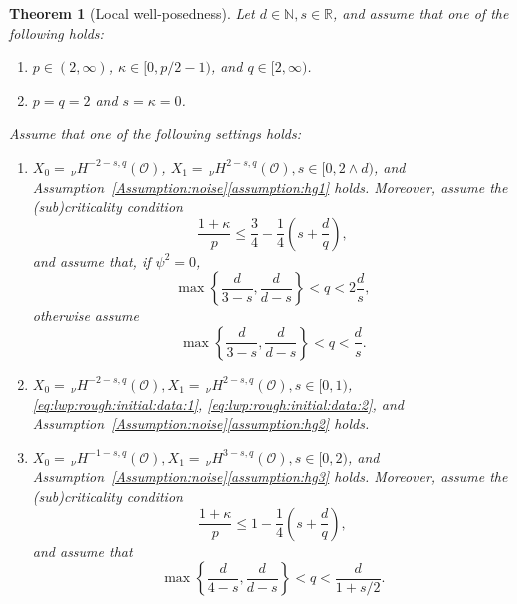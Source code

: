 \documentclass[reqno]{amsart}
\newtheorem{theorem}[Satz]{Theorem}
\newcommand{\N}{\mathbb{N}}
\newcommand{\R}{\mathbb{R}}
\newcommand{\sO}{\mathscr{O}}
\newcommand{\1}{\mathbf{1}}
\newcommand{\nH}{\ensuremath{\,_\nu H}}
\newcommand{\bpsn}[1]{\ensuremath{\nH^{#1}(\sO)}}
\begin{document}
	\begin{theorem}[Local well-posedness]\label{lwp:rough:initial:data}
		Let $d\in \N, s\in \R$, and assume that one of the following holds:
		\begin{enumerate}
			\item[i)] $p\in (2,\infty)$, $\kappa\in [0,p/2-1)$, and $q\in [2,\infty)$.
			\item[ii)] $p=q=2$ and $s=\kappa=0$.
		\end{enumerate} 
		Assume that one of the following settings holds:
		\begin{enumerate}
			\item\label{it:lwp:rough:initial:data:1} $X_0=\bpsn{-2-s,q}$, $X_1=\bpsn{2-s,q}, s\in [0,2\wedge d)$, and Assumption~\ref{Assumption:noise}\ref{assumption:hg1} holds.
			Moreover, assume the (sub)criticality condition
		\begin{equation}\label{eq:lwp:rough:initial:data:1}
			\frac{1+\kappa}{p}\le \frac{3}{4}-\frac{1}{4}\left(s+\frac{d}{q}\right), 
		\end{equation}
		and assume that, if $\psi^2=0$,
		\begin{equation}\label{eq:lwp:rough:initial:data:2}
			\max\left\{\frac{d}{3-s},\frac{d}{d-s}\right\}< q <2\frac{d}{s},
		\end{equation}
        otherwise assume 
        \begin{equation}
            \max\left\{\frac{d}{3-s},\frac{d}{d-s}\right\}<q<\frac{d}{s}.
        \end{equation}
        \item\label{it:lwp:rough:initial:data:2} $X_0=\bpsn{-2-s,q}, X_1=\bpsn{2-s,q}, s\in [0,1)$, \eqref{eq:lwp:rough:initial:data:1}, \eqref{eq:lwp:rough:initial:data:2}, and Assumption~\ref{Assumption:noise}\ref{assumption:hg2} holds.
			\item\label{it:lwp:rough:initial:data:3} $X_0=\bpsn{-1-s,q}, X_1=\bpsn{3-s,q}, s\in [0,2)$, and Assumption~\ref{Assumption:noise}\ref{assumption:hg3} holds. Moreover, assume the (sub)criticality condition
            \begin{equation}\label{eq:lwp:rough:initial:data:3}
                \frac{1+\kappa}{p}\le 1-\frac{1}{4}\left(s+\frac{d}{q}\right),
            \end{equation}
            and assume that 
            \begin{equation}\label{eq:lwp:rough:initial:data:4}
                \max\left\{\frac{d}{4-s},\frac{d}{d-s}\right\}<q<\frac{d}{1+s/2}.
            \end{equation}

\end{enumerate}
\end{theorem}
\end{document}
